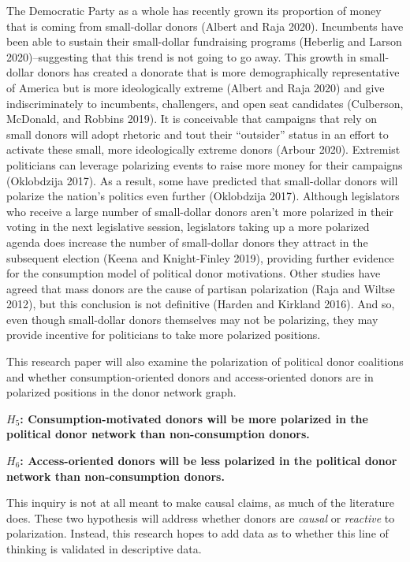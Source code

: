 \documentclass[12pt,]{article}
\begin{document}
The Democratic Party as a whole has recently grown its proportion of
money that is coming from small-dollar donors (Albert and Raja 2020).
Incumbents have been able to sustain their small-dollar fundraising
programs (Heberlig and Larson 2020)--suggesting that this trend is not
going to go away. This growth in small-dollar donors has created a
donorate that is more demographically representative of America but is
more ideologically extreme (Albert and Raja 2020) and give
indiscriminately to incumbents, challengers, and open seat candidates
(Culberson, McDonald, and Robbins 2019). It is conceivable that
campaigns that rely on small donors will adopt rhetoric and tout their
``outsider'' status in an effort to activate these small, more
ideologically extreme donors (Arbour 2020). Extremist politicians can
leverage polarizing events to raise more money for their campaigns
(Oklobdzija 2017). As a result, some have predicted that small-dollar
donors will polarize the nation's politics even further (Oklobdzija
2017). Although legislators who receive a large number of small-dollar
donors aren't more polarized in their voting in the next legislative
session, legislators taking up a more polarized agenda does increase the
number of small-dollar donors they attract in the subsequent election
(Keena and Knight-Finley 2019), providing further evidence for the
consumption model of political donor motivations. Other studies have
agreed that mass donors are the cause of partisan polarization (Raja and
Wiltse 2012), but this conclusion is not definitive (Harden and Kirkland
2016). And so, even though small-dollar donors themselves may not be
polarizing, they may provide incentive for politicians to take more
polarized positions.

This research paper will also examine the polarization of political
donor coalitions and whether consumption-oriented donors and
access-oriented donors are in polarized positions in the donor network
graph.

\textbf{\(H_{5}\): Consumption-motivated donors will be more polarized
in the political donor network than non-consumption donors.}

\textbf{\(H_{6}\): Access-oriented donors will be less polarized in the
political donor network than non-consumption donors.}

This inquiry is not at all meant to make causal claims, as much of the
literature does. These two hypothesis will address whether donors are
\emph{causal} or \emph{reactive} to polarization. Instead, this research
hopes to add data as to whether this line of thinking is validated in
descriptive data.
\end{document}
